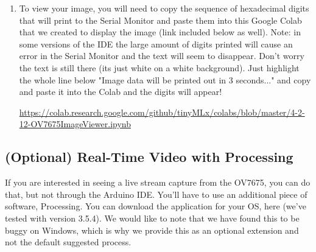 \begin{enumerate}
  \item To view your image, you will need to copy the sequence of hexadecimal digits that will print to the Serial Monitor and paste them into this Google Colab that we created to display the image (link included below as well). Note: in some versions of the IDE the large amount of digits printed will cause an error in the Serial Monitor and the text will seem to disappear. Don't worry the text is still there (its just white on a white background). Just highlight the whole line below "Image data will be printed out in 3 seconds..." and copy and paste it into the Colab and the digits will appear!

  \url{https://colab.research.google.com/github/tinyMLx/colabs/blob/master/4-2-12-OV7675ImageViewer.ipynb}
\end{enumerate}  

\subsection{(Optional) Real-Time Video with Processing}

If you are interested in seeing a live stream capture from the OV7675, you can do that, but not through the Arduino IDE. You’ll have to use an additional piece of software, Processing. You can download the application for your OS, here (we’ve tested with version 3.5.4). We would like to note that we have found this to be buggy on Windows, which is why we provide this as an optional extension and not the default suggested process.

